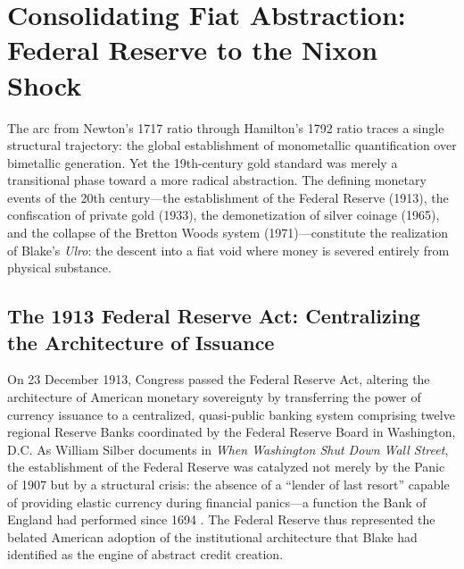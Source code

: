 \documentclass[
]{article}
\begin{document}
\newpage

\section{Consolidating Fiat Abstraction: Federal Reserve to the Nixon
Shock}\label{consolidating-fiat-abstraction-federal-reserve-to-the-nixon-shock}

The arc from Newton's 1717 ratio through Hamilton's 1792 ratio traces a
single structural trajectory: the global establishment of monometallic
quantification over bimetallic generation. Yet the 19th-century gold
standard was merely a transitional phase toward a more radical
abstraction. The defining monetary events of the 20th century---the
establishment of the Federal Reserve (1913), the confiscation of private
gold (1933), the demonetization of silver coinage (1965), and the
collapse of the Bretton Woods system (1971)---constitute the realization
of Blake's \emph{Ulro}: the descent into a fiat void where money is
severed entirely from physical substance.

\subsection{The 1913 Federal Reserve Act: Centralizing the Architecture
of
Issuance}\label{the-1913-federal-reserve-act-centralizing-the-architecture-of-issuance}

On 23 December 1913, Congress passed the Federal Reserve Act, altering
the architecture of American monetary sovereignty by transferring the
power of currency issuance to a centralized, quasi-public banking system
comprising twelve regional Reserve Banks coordinated by the Federal
Reserve Board in Washington, D.C. As William Silber documents in
\emph{When Washington Shut Down Wall Street}, the establishment of the
Federal Reserve was catalyzed not merely by the Panic of 1907 but by a
structural crisis: the absence of a ``lender of last resort'' capable of
providing elastic currency during financial panics---a function the Bank
of England had performed since 1694 \citep{silber2007when}. The Federal
Reserve thus represented the belated American adoption of the
institutional architecture that Blake had identified as the engine of
abstract credit creation.
\end{document}
